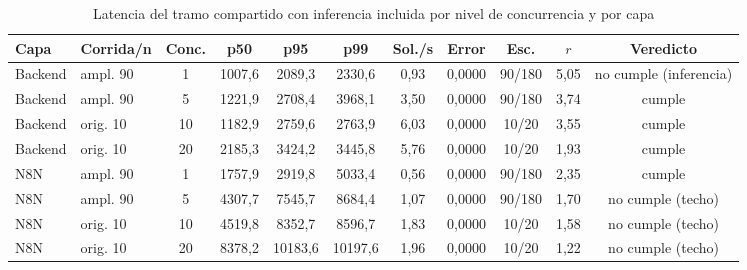 \begin{table}[htbp]
\centering
\caption{Latencia del tramo compartido con inferencia incluida por nivel de concurrencia y por capa}
\label{tab:carga-inferencia}
\footnotesize
\setlength{\tabcolsep}{3pt}
\begin{tabular}{@{}llccccccccc@{}}
\toprule
\textbf{Capa} & \textbf{Corrida/n} & \textbf{Conc.} & \textbf{p50} & \textbf{p95} & \textbf{p99} & \textbf{Sol./s} & \textbf{Error} & \textbf{Esc.} & \textbf{\(r\)} & \textbf{Veredicto} \\
\midrule
Backend & ampl. 90 & 1 & 1007,6 & 2089,3 & 2330,6 & 0,93 & 0,0000 & 90/180 & 5,05 & no cumple (inferencia) \\
Backend & ampl. 90 & 5 & 1221,9 & 2708,4 & 3968,1 & 3,50 & 0,0000 & 90/180 & 3,74 & cumple \\
Backend & orig. 10 & 10 & 1182,9 & 2759,6 & 2763,9 & 6,03 & 0,0000 & 10/20 & 3,55 & cumple \\
Backend & orig. 10 & 20 & 2185,3 & 3424,2 & 3445,8 & 5,76 & 0,0000 & 10/20 & 1,93 & cumple \\
\midrule
N8N & ampl. 90 & 1 & 1757,9 & 2919,8 & 5033,4 & 0,56 & 0,0000 & 90/180 & 2,35 & cumple \\
N8N & ampl. 90 & 5 & 4307,7 & 7545,7 & 8684,4 & 1,07 & 0,0000 & 90/180 & 1,70 & no cumple (techo) \\
N8N & orig. 10 & 10 & 4519,8 & 8352,7 & 8596,7 & 1,83 & 0,0000 & 10/20 & 1,58 & no cumple (techo) \\
N8N & orig. 10 & 20 & 8378,2 & 10183,6 & 10197,6 & 1,96 & 0,0000 & 10/20 & 1,22 & no cumple (techo) \\
\bottomrule
\end{tabular}
\par\smallskip

\end{table}
